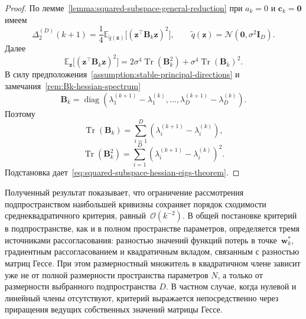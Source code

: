 \begin{proof}
    По лемме~\ref{lemma:squared-subspace-general-reduction} при $a_k=0$ и $\mathbf c_k=\mathbf 0$ имеем
    \begin{equation}
        \Delta_{2}^{(D)}(k+1)
        =
        \frac14
        \mathbb E_{\tilde q(\mathbf z)}
        \big[
            (\mathbf z^\top \mathbf B_k \mathbf z)^2
        \big],
        \qquad
        \tilde q(\mathbf z)=\mathcal N(\mathbf 0, \sigma^2\mathbf I_D).
    \end{equation}
    Далее
    \begin{equation}
        \mathbb E_{\mathbf z}
        \big[
            (\mathbf z^\top \mathbf B_k \mathbf z)^2
        \big]
        =
        2\sigma^4 \operatorname{Tr}(\mathbf B_k^2)
        +
        \sigma^4 \operatorname{Tr}(\mathbf B_k)^2.
    \end{equation}
    В силу предположения~\ref{assumption:stable-principal-directions} и замечания~\ref{rem:Bk-hessian-spectrum}
    \begin{equation}
        \mathbf B_k
        =
        \operatorname{diag}\left(
            \lambda_1^{(k+1)}-\lambda_1^{(k)},
            \ldots,
            \lambda_D^{(k+1)}-\lambda_D^{(k)}
        \right).
    \end{equation}
    Поэтому
    \begin{equation}
        \operatorname{Tr}(\mathbf B_k)
        =
        \sum_{i=1}^{D}
        \left(
            \lambda_i^{(k+1)}-\lambda_i^{(k)}
        \right),
    \end{equation}
    \begin{equation}
        \operatorname{Tr}(\mathbf B_k^2)
        =
        \sum_{i=1}^{D}
        \left(
            \lambda_i^{(k+1)}-\lambda_i^{(k)}
        \right)^2.
    \end{equation}
    Подстановка дает~\eqref{eq:squared-subspace-hessian-eigs-theorem}.
\end{proof}

Полученный результат показывает, что ограничение рассмотрения подпространством наибольшей кривизны сохраняет порядок сходимости среднеквадратичного критерия, равный~$\mathcal O(k^{-2})$. В общей постановке критерий в подпространстве, как и в полном пространстве параметров, определяется тремя источниками рассогласования: разностью значений функций потерь в точке~$\mathbf w_k^*$, градиентным рассогласованием и квадратичным вкладом, связанным с разностью матриц Гессе. При этом размерностный множитель в квадратичном члене зависит уже не от полной размерности пространства параметров $N$, а только от размерности выбранного подпространства $D$. В частном случае, когда нулевой и линейный члены отсутствуют, критерий выражается непосредственно через приращения ведущих собственных значений матрицы Гессе.

